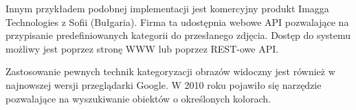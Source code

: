 Innym przykładem podobnej implementacji jest komercyjny produkt Imagga Technologies z Sofii (Bułgaria). Firma ta udostępnia webowe API pozwalające na przypisanie predefiniowanych kategorii do przesłanego zdjęcia. Dostęp do systemu możliwy jest poprzez stronę WWW lub poprzez REST-owe API\cite{IMAGGA}.

Zastosowanie pewnych technik kategoryzacji obrazów widoczny jest również w najnowszej wersji przeglądarki Google. W 2010 roku pojawiło się narzędzie pozwalające na wyszukiwanie obiektów o określonych kolorach\cite{Google2010}.



